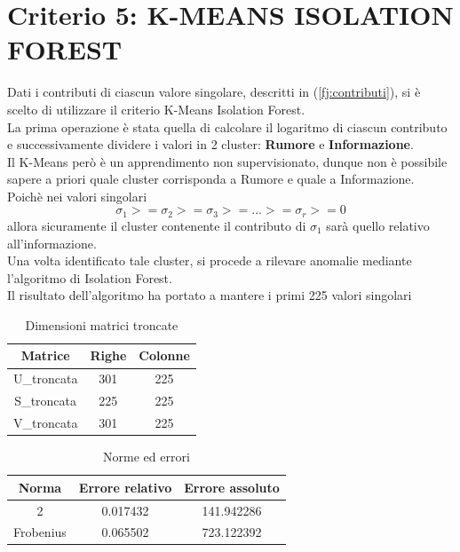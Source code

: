 \section{Criterio 5: K-MEANS ISOLATION FOREST}

Dati i contributi di ciascun valore singolare, descritti in (\ref{fj:contributi}), si è scelto di utilizzare il criterio K-Means Isolation Forest.\\
La prima operazione è stata quella di calcolare il logaritmo di ciascun contributo e successivamente dividere i valori in 2 cluster: \textbf{Rumore} e \textbf{Informazione}.\\
Il K-Means però è un apprendimento non supervisionato, dunque non è possibile sapere a priori quale cluster corrisponda a Rumore e quale a Informazione.\\
Poichè nei valori singolari
\begin{equation}
    \sigma_1 >= \sigma_2 >= \sigma_3 >= ... >= \sigma_r>=0
\end{equation}
allora sicuramente il cluster contenente il contributo di $\sigma_1$ sarà quello relativo all'informazione.\\
Una volta identificato tale cluster, si procede a rilevare anomalie mediante l'algoritmo di Isolation Forest.\\

\noindent Il risultato dell'algoritmo ha portato a mantere i primi 225 valori singolari
 \begin{table}[H]
    \centering
    \begin{tabular}{|c|c|c|}
        \hline
        \textbf{Matrice} & \textbf{Righe} & \textbf{Colonne} \\
        \hline
        U\_troncata & 301 & 225 \\
        \hline
        S\_troncata & 225 & 225 \\
        \hline
        V\_troncata & 301 & 225 \\
        \hline
    \end{tabular}
    \caption{Dimensioni matrici troncate}
\end{table}

\begin{table}[H]
    \centering
    \begin{tabular}{|c|c|c|}
        \hline
        \textbf{Norma} & \textbf{Errore relativo} & \textbf{Errore assoluto} \\
        \hline
        2 & 0.017432 & 141.942286  \\
        \hline
        Frobenius & 0.065502 & 723.122392 \\
        \hline
    \end{tabular}
    \caption{Norme ed errori}
\end{table}

